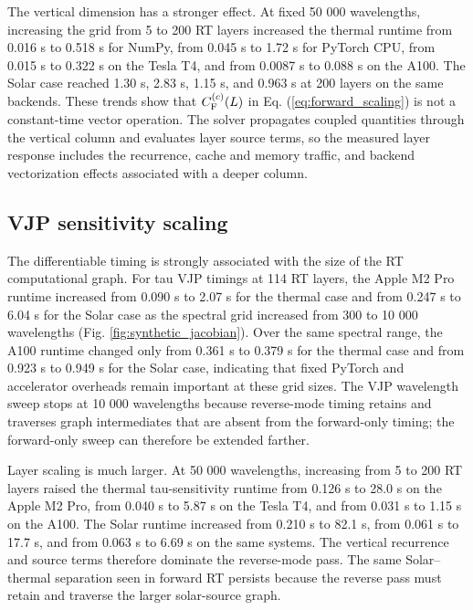 \documentclass[gmd, manuscript]{copernicus}
\begin{document}
The vertical dimension has a stronger effect.  At fixed 50 000 wavelengths, increasing
the grid from 5 to 200 RT layers increased the thermal runtime from 0.016 s to
0.518 s for NumPy, from 0.045 s to 1.72 s for PyTorch CPU, from 0.015 s to
0.322 s on the Tesla T4, and from 0.0087 s to 0.088 s on the A100.  The
Solar case reached 1.30 s, 2.83 s, 1.15 s, and 0.963 s at 200 layers on the
same backends.  These trends show that
$C_{\rm F}^{(c)}(L)$ in Eq. (\ref{eq:forward_scaling}) is not a constant-time vector
operation.  The solver propagates coupled quantities through the vertical column and
evaluates layer source terms, so the measured layer response includes the recurrence,
cache and memory traffic, and backend vectorization effects associated with a deeper
column.

\subsection{VJP sensitivity scaling}

The differentiable timing is strongly associated with the size of the RT computational
graph.  For tau VJP timings at 114 RT layers, the Apple M2 Pro runtime increased from
0.090 s to 2.07 s for the thermal case and from 0.247 s to 6.04 s for the
Solar case as the spectral grid increased from 300 to 10 000 wavelengths
(Fig. \ref{fig:synthetic_jacobian}).  Over the same spectral range, the A100 runtime
changed only from 0.361 s to 0.379 s for the thermal case and from 0.923 s to
0.949 s for the Solar case, indicating that fixed PyTorch and accelerator
overheads remain important at these grid sizes.  The VJP wavelength sweep stops at
10 000 wavelengths because reverse-mode timing retains and traverses graph
intermediates that are absent from the forward-only timing; the forward-only sweep can
therefore be extended farther.

Layer scaling is much larger.  At 50 000 wavelengths, increasing from 5 to 200 RT
layers raised the thermal tau-sensitivity runtime from 0.126 s to 28.0 s on the
Apple M2 Pro, from 0.040 s to 5.87 s on the Tesla T4, and from 0.031 s to 1.15 s on
the A100.  The Solar runtime increased from 0.210 s to 82.1 s, from 0.061 s to
17.7 s, and from 0.063 s to 6.69 s on the same systems.  The vertical recurrence and
source terms therefore dominate the reverse-mode pass.  The same Solar--thermal
separation seen in forward RT persists because the reverse pass must retain and
traverse the larger solar-source graph.
\end{document}
